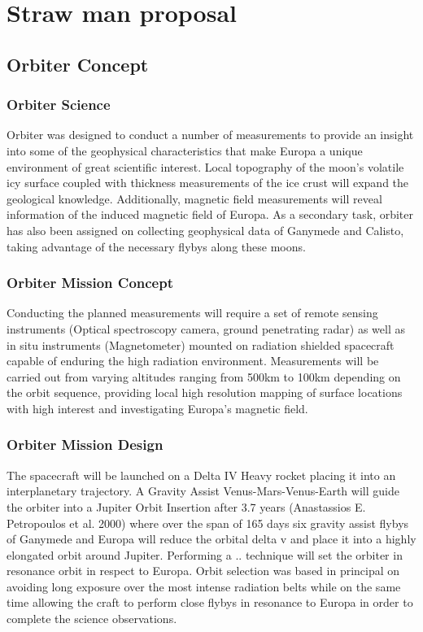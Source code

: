 

\section{Straw man proposal}

\subsection{Orbiter Concept}

\subsubsection{Orbiter Science}
Orbiter was designed to conduct a number of measurements to provide an insight into some of the geophysical characteristics that make Europa a unique environment of great scientific interest. Local topography of the moon’s volatile icy surface coupled with thickness measurements of the ice crust will expand the geological knowledge. Additionally, magnetic field measurements will reveal information of the induced magnetic field of Europa. As a secondary task, orbiter has also been assigned on collecting geophysical data of Ganymede and Calisto, taking advantage of the necessary flybys along these moons.

\subsubsection{Orbiter Mission Concept}

Conducting the planned measurements will require a set of remote sensing instruments (Optical spectroscopy camera, ground penetrating radar) as well as in situ instruments (Magnetometer) mounted on radiation shielded spacecraft capable of enduring the high radiation environment. Measurements will be carried out from varying altitudes ranging from 500km to 100km depending on the orbit sequence, providing local high resolution mapping of surface locations with high interest and investigating Europa’s magnetic field. 

\subsubsection{Orbiter Mission Design}
The spacecraft will be launched on a Delta IV Heavy rocket placing it into an interplanetary trajectory. A Gravity Assist Venus-Mars-Venus-Earth will guide the orbiter into a Jupiter Orbit Insertion after 3.7 years (Anastassios E. Petropoulos et al. 2000) where over the span of 165 days six gravity assist flybys of Ganymede and Europa will reduce the orbital delta v and place it into a highly elongated orbit around Jupiter. Performing a {{..}} technique will set the orbiter in resonance orbit in respect to Europa. Orbit selection was based in principal on avoiding long exposure over the most intense radiation belts while on the same time allowing the craft to perform close flybys in resonance to Europa in order to complete the science observations.

